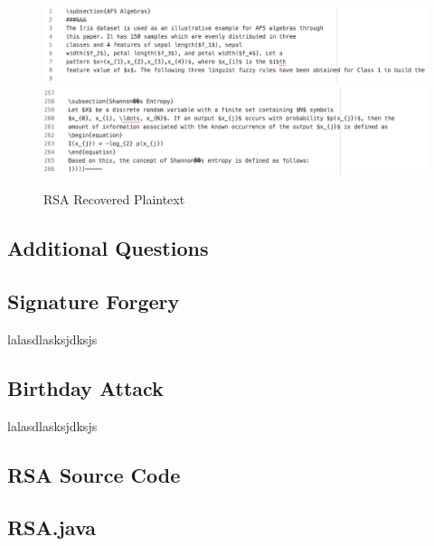 \documentclass[]{article}
\begin{document}
\begin{figure}[H]
	\includegraphics[height=\textheight/6,width=\textwidth]{rsa_plain1.png}
	\includegraphics[height=\textheight/6,width=\textwidth]{rsa_plain2.png}	
	\caption{RSA Recovered Plaintext}
	\centering
\end{figure}

\pagebreak


\vspace*{-0.8cm}
\begin{center}
	\section*{Additional Questions}
\end{center}

\subsection*{Signature Forgery}

lalasdlasksjdksjs

\subsection*{Birthday Attack}

lalasdlasksjdksjs

\pagebreak


\vspace*{-0.8cm}
\begin{center}
	\section*{RSA Source Code}
\end{center}

\subsection*{RSA.java}
\pagebreak{}


\break
\setlength{}
\printbibliography[title={References}]

\end{document}
